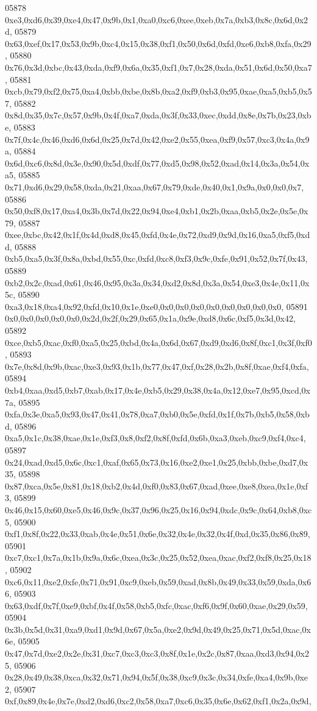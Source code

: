 \begin{DoxyCode}
05878   0xe3,0xd6,0x39,0xe4,0x47,0x9b,0x1,0xa0,0xc6,0xee,0xeb,0x7a,0xb3,0x8c,0x6d,0x2d,
05879   0x63,0xef,0x17,0x53,0x9b,0xc4,0x15,0x38,0xf1,0x50,0x6d,0xfd,0xe6,0xb8,0xfa,0x29,
05880   0x76,0x3d,0xbc,0x43,0xda,0xf9,0x6a,0x35,0xf1,0x7,0x28,0xda,0x51,0x6d,0x50,0xa7,
05881   0xcb,0x79,0xf2,0x75,0xa4,0xbb,0xbe,0x8b,0xa2,0xf9,0xb3,0x95,0xae,0xa5,0xb5,0x57,
05882   0x8d,0x35,0x7c,0x57,0x9b,0x4f,0xa7,0xda,0x3f,0x33,0xec,0xdd,0x8e,0x7b,0x23,0xbe,
05883   0x7f,0x4c,0x46,0xd6,0x6d,0x25,0x7d,0x42,0xe2,0x55,0xea,0xf9,0x57,0xc3,0x4a,0x9a,
05884   0x6d,0xc6,0x8d,0x3e,0x90,0x5d,0xdf,0x77,0xd5,0x98,0x52,0xad,0x14,0x3a,0x54,0xa5,
05885   0x71,0xd6,0x29,0x58,0xda,0x21,0xaa,0x67,0x79,0xde,0x40,0x1,0x9a,0x0,0x0,0x7,
05886   0x50,0xf8,0x17,0xa4,0x3b,0x7d,0x22,0x94,0xe4,0xb1,0x2b,0xaa,0xb5,0x2e,0x5e,0x79,
05887   0xee,0xbc,0x42,0x1f,0x4d,0xd8,0x45,0xfd,0x4e,0x72,0xd9,0x9d,0x16,0xa5,0xf5,0xdd,
05888   0xb5,0xa5,0x3f,0x8a,0xbd,0x55,0xc,0xfd,0xc8,0xf3,0x9c,0xfe,0x91,0x52,0x7f,0x43,
05889   0xb2,0x2c,0xad,0x61,0x46,0x95,0x3a,0x34,0xd2,0x8d,0x3a,0x54,0xe3,0x4e,0x11,0x5c,
05890   0xa3,0x18,0xa4,0x92,0xfd,0x10,0x1e,0xe0,0x0,0x0,0x0,0x0,0x0,0x0,0x0,0x0,
05891   0x0,0x0,0x0,0x0,0x0,0x2d,0x2f,0x29,0x65,0x1a,0x9e,0xd8,0x6c,0xf5,0x3d,0x42,
05892   0xce,0xb5,0xac,0xf0,0xa5,0x25,0xbd,0x4a,0x6d,0x67,0xd9,0xd6,0x8f,0xc1,0x3f,0xf0,
05893   0x7e,0x8d,0x9b,0xac,0xe3,0x93,0x1b,0x77,0x47,0xf,0x28,0x2b,0x8f,0xae,0xf4,0xfa,
05894   0xb4,0xaa,0xd5,0xb7,0xab,0x17,0x4e,0xb5,0x29,0x38,0x4a,0x12,0xe7,0x95,0xcd,0x7a,
05895   0xfa,0x3e,0xa5,0x93,0x47,0x41,0x78,0xa7,0xb0,0x5e,0xfd,0x1f,0x7b,0xb5,0x58,0xbd,
05896   0xa5,0x1c,0x38,0xae,0x1e,0xf3,0x8,0xf2,0x8f,0xfd,0x6b,0xa3,0xeb,0xc9,0xf4,0xc4,
05897   0x24,0xad,0xd5,0x6c,0xc1,0xaf,0x65,0x73,0x16,0xe2,0xe1,0x25,0xbb,0xbe,0xd7,0x35,
05898   0x87,0xca,0x5e,0x81,0x18,0xb2,0x4d,0xf0,0x83,0x67,0xad,0xee,0xe8,0xea,0x1e,0xf3,
05899   0x46,0x15,0x60,0xe5,0x46,0x9c,0x37,0x96,0x25,0x16,0x94,0xdc,0x9c,0x64,0xb8,0xc5,
05900   0xf1,0x8f,0x22,0x33,0xab,0x4e,0x51,0x6e,0x32,0x4e,0x32,0x4f,0xd,0x35,0x86,0x89,
05901   0xc7,0xc1,0x7a,0x1b,0x9a,0x6c,0xea,0x3c,0x25,0x52,0xea,0xac,0xf2,0xf8,0x25,0x18,
05902   0xc6,0x11,0xe2,0xfe,0x71,0x91,0xc9,0xeb,0x59,0xad,0x8b,0x49,0x33,0x59,0xda,0x66,
05903   0x63,0xdf,0x7f,0xe9,0xbf,0x4f,0x58,0xb5,0xfc,0xac,0xf6,0x9f,0x60,0xae,0x29,0x59,
05904   0x3b,0x5d,0x31,0xa9,0xd1,0x9d,0x67,0x5a,0xe2,0x9d,0x49,0x25,0x71,0x5d,0xac,0x6e,
05905   0x47,0x7d,0xe2,0x2e,0x31,0xc7,0xc3,0xc3,0x8f,0x1e,0x2c,0x87,0xaa,0xd3,0x94,0x25,
05906   0x28,0x49,0x38,0xca,0x32,0x71,0x94,0x5f,0x38,0xc9,0x3c,0x34,0xfe,0xa4,0x9b,0xe2,
05907   0xf,0x89,0x4e,0x7e,0xd2,0xd6,0xc2,0x58,0xa7,0xc6,0x35,0x6e,0x62,0xf1,0x2a,0x9d,

\end{DoxyCode}
